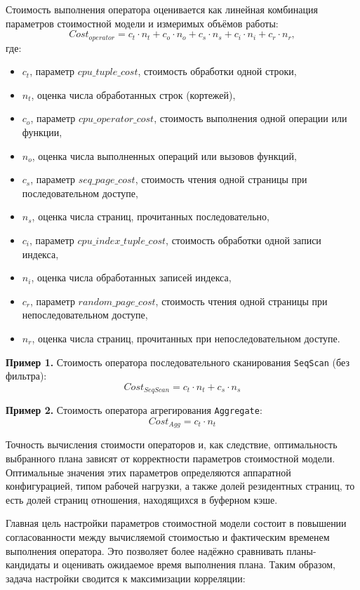 Стоимость выполнения оператора оценивается как линейная комбинация параметров стоимостной модели и измеримых объёмов работы:
\begin{equation}
    Cost_{operator}=c_t \cdot n_t+c_o \cdot n_o+c_s \cdot n_s+c_i \cdot n_i+c_r \cdot n_r,
\end{equation}
где:
\begin{itemize}
    \item \(c_t\), параметр \(cpu\_tuple\_cost\), стоимость обработки одной строки,
    \item \(n_t\), оценка числа обработанных строк (кортежей),
    \item \(c_o\), параметр \(cpu\_operator\_cost\), стоимость выполнения одной операции или функции,
    \item \(n_o\), оценка числа выполненных операций или вызовов функций,
    \item \(c_s\), параметр \(seq\_page\_cost\), стоимость чтения одной страницы при последовательном доступе,
    \item \(n_s\), оценка числа страниц, прочитанных последовательно,
    \item \(c_i\), параметр \(cpu\_index\_tuple\_cost\), стоимость обработки одной записи индекса,
    \item \(n_i\), оценка числа обработанных записей индекса,
    \item \(c_r\), параметр \(random\_page\_cost\), стоимость чтения одной страницы при непоследовательном доступе,
    \item \(n_r\), оценка числа страниц, прочитанных при непоследовательном доступе.
\end{itemize}

\textbf{Пример 1.} Стоимость оператора последовательного сканирования \texttt{SeqScan} (без фильтра):
\[
Cost_{SeqScan}=c_t \cdot n_t+c_s \cdot n_s
\]

\textbf{Пример 2.} Стоимость оператора агрегирования \texttt{Aggregate}:
\[
Cost_{Agg}=c_t \cdot n_t
\]

Точность вычисления стоимости операторов и, как следствие, оптимальность выбранного плана зависят от корректности параметров стоимостной модели. Оптимальные значения этих параметров определяются аппаратной конфигурацией, типом рабочей нагрузки, а также долей резидентных страниц, то есть долей страниц отношения, находящихся в буферном кэше.

Главная цель настройки параметров стоимостной модели состоит в повышении согласованности между вычисляемой стоимостью и фактическим временем выполнения оператора. Это позволяет более надёжно сравнивать планы-кандидаты и оценивать ожидаемое время выполнения плана. Таким образом, задача настройки сводится к максимизации корреляции:

